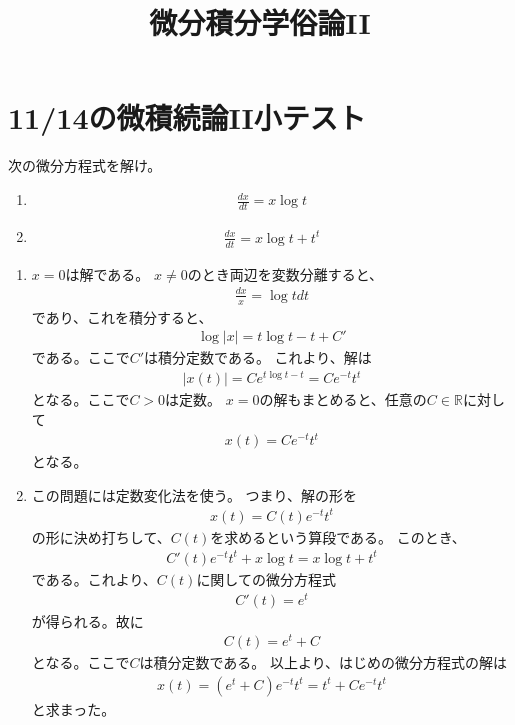 \documentclass[fleqn]{jsarticle}
\begin{document}
\title{微分積分学俗論II}
\maketitle
\section{11/14の微積続論II小テスト}
\begin{shaded}
次の微分方程式を解け。
\begin{enumerate}
\item 
\begin{eqnarray}
\frac{dx}{dt}=x\log t
\end{eqnarray}
\item 
\begin{eqnarray}
\frac{dx}{dt}=x\log t+t^{t}
\end{eqnarray}
\end{enumerate}
\end{shaded}
\begin{enumerate}
\item 
$x=0$は解である。
$x\ne 0$のとき両辺を変数分離すると、
\begin{eqnarray}
\frac{dx}{x}=\log tdt
\end{eqnarray}
であり、これを積分すると、
\begin{eqnarray}
\log |x|=t\log t-t+C'
\end{eqnarray}
である。ここで$C'$は積分定数である。
これより、解は
\begin{eqnarray}
|x(t)|=Ce^{t\log t-t}=Ce^{-t}t^{t}
\end{eqnarray}
となる。ここで$C>0$は定数。
$x=0$の解もまとめると、任意の$C\in\mathbb{R}$に対して
\begin{eqnarray}
x(t)=Ce^{-t}t^{t}
\end{eqnarray}
となる。
\item
この問題には定数変化法を使う。
つまり、解の形を
\begin{eqnarray}
x(t)=C(t)e^{-t}t^{t}
\end{eqnarray}
の形に決め打ちして、$C(t)$を求めるという算段である。
このとき、
\begin{eqnarray}
C'(t)e^{-t}t^{t}+x\log t=x\log t+t^{t}
\end{eqnarray}
である。これより、$C(t)$に関しての微分方程式
\begin{eqnarray}
C'(t)=e^{t}
\end{eqnarray}
が得られる。故に
\begin{eqnarray}
C(t)=e^{t}+C
\end{eqnarray}
となる。ここで$C$は積分定数である。
以上より、はじめの微分方程式の解は
\begin{eqnarray}
x(t)=(e^{t}+C)e^{-t}t^{t}=t^{t}+Ce^{-t}t^{t}
\end{eqnarray}
と求まった。
\end{enumerate}
\end{document}
